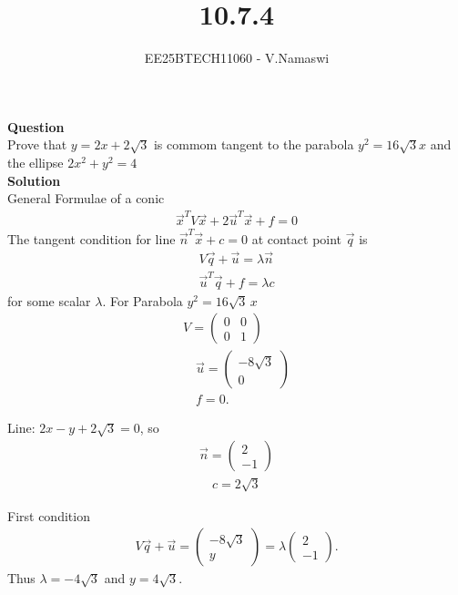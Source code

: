 \documentclass[journal]{IEEEtran}
\begin{document}

\vspace{3cm}

\title{10.7.4}
\author{EE25BTECH11060 - V.Namaswi}
{\let\newpage\relax\maketitle}
\renewcommand{\thefigure}{\theenumi}
\renewcommand{\thetable}{\theenumi}
\setlength{\intextsep}{10pt} %
\textbf{Question}\\
Prove that $y=2x+2\sqrt{3}$  is commom tangent to the parabola $y^2=16\sqrt{3}x$ and the ellipse $2x^2+y^2=4$\\
\textbf{Solution}\\
General Formulae of a conic\\
\begin{align}
\vec{x}^T V \vec{x} + 2 \vec{u}^T \vec{x} + f = 0
\end{align}
The tangent condition for line $\vec{n}^T \vec{x} + c = 0$ at contact point $\vec{q}$ is
\begin{align}
V\vec{q} + \vec{u} = \lambda \vec{n}\\ 
\vec{u}^T \vec{q} + f = \lambda c
\end{align}
for some scalar $\lambda$.
For Parabola $y^2 = 16\sqrt{3}\,x$
 \begin{align}
V = \begin{pmatrix}0 & 0 \\ 0 & 1\end{pmatrix}\\
\quad 
\vec{u} = \begin{pmatrix}-8\sqrt{3} \\ 0\end{pmatrix}\\
\quad 
f = 0.
\end{align}

Line: $2x - y + 2\sqrt{3} = 0$, so
\begin{align}
\vec{n} = \begin{pmatrix}2 \\ -1\end{pmatrix} \\
\quad c = 2\sqrt{3}
\end{align}

\noindent First condition
\begin{align}
V\vec{q} + \vec{u} = \begin{pmatrix}-8\sqrt{3} \\ y\end{pmatrix} 
= \lambda \begin{pmatrix}2 \\ -1\end{pmatrix}.
\end{align}
Thus $\lambda = -4\sqrt{3}$  and $y = 4\sqrt{3}$.
\end{document}

